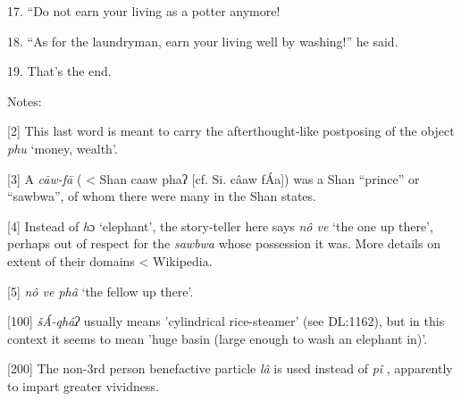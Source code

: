 {\LARGE{}17. ``Do not earn your living as a potter anymore!}

{\LARGE{}18. ``As for the laundryman, earn your living well by washing!'' he said.}

{\LARGE{}19. That's the end.}

{\LARGE{}Notes:}

{\LARGE{}[2] This last word is meant to carry the afterthought-like postposing
of the object }{\LARGE{}\textit{phu}}{\LARGE{} `money, wealth'.}

{\LARGE{}[3] A }{\textit{cāw-fā}}{\LARGE{} ( < Shan caaw phaʔ
[cf. Si. câaw fÁa]) was a Shan ``prince'' or ``sawbwa'', of whom there were many
in the Shan states.}

{\LARGE{}[4] Instead of }{\LARGE{}\textit{h}}{\LARGE{}ɔ}{\LARGE{}\textit{ }}{\LARGE{}`elephant',
the story-teller here says }{\LARGE{}\textit{nô ve}}{\LARGE{} `the one up there',
perhaps out of respect for the }{\LARGE{}\textit{sawbwa}}{\LARGE{} whose possession
it was.  More details on extent of their domains < Wikipedia.}

{\LARGE{}[5] }{\LARGE{}\textit{nô ve phâ }}{\LARGE{}`the fellow up there'.}

{\LARGE{}[100] }{\textit{šÁ-qhâʔ }}{\LARGE{}usually means 'cylindrical
rice-steamer' (see DL:1162), but in this context it seems to mean 'huge basin (large
enough to wash an elephant in)'.}

{\LARGE{}[200] The non-3rd person benefactive particle  }{\textit{lâ}}
{\LARGE{} is used instead of }{\LARGE{}\textit{ }}{\textit{pî}}{\scriptsize{}
}{\LARGE{} , apparently to impart greater vividness.}


